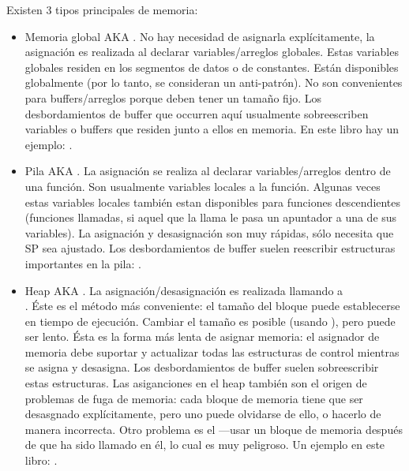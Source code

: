 ﻿%

Existen 3 tipos principales de memoria:

\begin{itemize}
\item
Memoria global \ac{AKA} .
No hay necesidad de asignarla expl\'icitamente, la asignaci\'on es realizada al declarar
variables/arreglos globales.
Estas variables globales residen en los segmentos de datos o de constantes.
Est\'an disponibles globalmente (por lo tanto, se consideran un anti-patr\'on).
No son convenientes para buffers/arreglos porque deben tener un tama\~no fijo.
Los desbordamientos de buffer que occurren aqu\'i usualmente sobreescriben variables o buffers que residen
junto a ellos en memoria.
En este libro hay un ejemplo: .

\item
Pila \ac{AKA} .
La asignaci\'on se realiza al declarar variables/arreglos dentro de una funci\'on.
Son usualmente variables locales a la funci\'on.
Algunas veces estas variables locales tambi\'en estan disponibles para funciones descendientes
(funciones llamadas, si aquel que la llama le pasa un apuntador a una de sus variables).
La asignaci\'on y desasignaci\'on son muy r\'apidas, s\'olo necesita que \ac{SP} sea ajustado.
\ESph{}
Los desbordamientos de buffer suelen reescribir estructuras importantes en la pila: .

\item
Heap \ac{AKA} .
La asignaci\'on/desasignaci\'on es realizada llamando a \\
 \ESph{}  \ESph{} \Cpp.
\'Este es el m\'etodo m\'as conveniente: el tama\~no del bloque puede establecerse en tiempo de ejecuci\'on.
Cambiar el tama\~no es posible (usando ), pero puede ser lento.
\'Esta es la forma m\'as lenta de asignar memoria:
el asignador de memoria debe suportar y actualizar todas las estructuras de control
mientras se asigna y desasigna.
Los desbordamientos de buffer suelen sobreescribir estas estructuras.
Las asiganciones en el heap tambi\'en son el origen de problemas de fuga de memoria: cada bloque de memoria tiene
que ser desasgnado expl\'icitamente, pero uno puede olvidarse de ello, o hacerlo de manera incorrecta.
Otro problema es el ---usar un bloque de memoria despu\'es
de que  ha sido llamado en \'el, lo cual es muy peligroso.
Un ejemplo en este libro:
.

\end{itemize}
